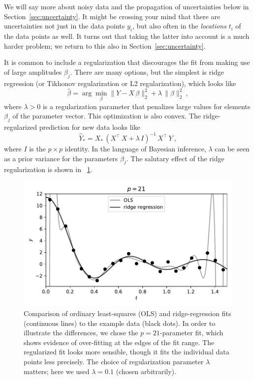 \documentclass[12pt,letterpaper]{article}
\newlength{\figurewidth}
\newcommand{\sectionname}{Section}
\begin{document}
We will say more about noisy data and the propagation of uncertainties below in \sectionname~\ref{sec:uncertainty}.
It might be crossing your mind that there are uncertainties not just in the data points $y_i$, but also often in the \emph{locations} $t_i$ of the data points as well. It turns out that taking the latter into account is a much harder problem; we return to this also in \sectionname~\ref{sec:uncertainty}.

It is common to include a regularization that discourages the fit from making use of large amplitudes $\beta_j$.
There are many options, but the simplest is ridge regression (or Tikhonov regularization or L2 regularization), which looks like
\begin{equation}
    \hat{\beta} = \arg\min_\beta \|Y - X\,\beta\|_2^2 + \lambda\,\|\beta\|_2^2
    ~,
\end{equation}
where $\lambda>0$ is a regularization parameter that penalizes large values for elements $\beta_j$ of the parameter vector.
This optimization is also convex.
The ridge-regularized prediction for new data looks like
\begin{equation} \label{eq:ridge}
    \hat{Y}_\ast = X_\ast\,(X^\top\,X + \lambda\,I)^{-1}\,X^\top\,Y
    ~,
\end{equation}
where $I$ is the $p\times p$ identity.
In the language of Bayesian inference, $\lambda$ can be seen as a prior variance for the parameters $\beta_j$.
The salutary effect of the ridge regularization is shown in \figurename~\ref{fig:ridge}.
\begin{figure}[t]
    \begin{mdframed}
    \includegraphics[width=\figurewidth]{paper/ridge.pdf}
    \caption{Comparison of ordinary least-squares (OLS) and ridge-regression fits (continuous lines) to the example data (black dots). In order to illustrate the differences, we chose the $p=21$-parameter fit, which shows evidence of over-fitting at the edges of the fit range. The regularized fit looks more sensible, though it fits the individual data points less precisely. The choice of regularization parameter $\lambda$ matters; here we used $\lambda=0.1$ (chosen arbitrarily).}
    \label{fig:ridge}
    \end{mdframed}
\end{figure}
\end{document}
